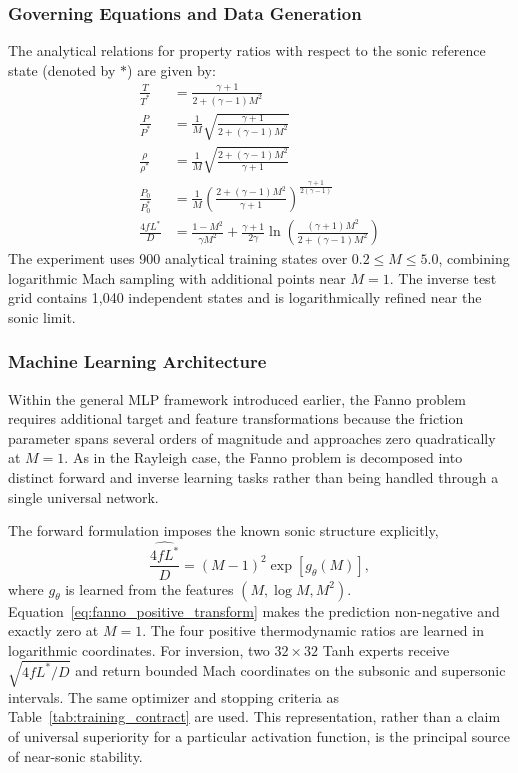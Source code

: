 \documentclass[preprint,12pt]{elsarticle}
\newcommand{\rev}[1]{#1}
\newenvironment{revision}{}{}
\newcommand{\rev}[1]{\textcolor{revisionblue}{#1}}
\newenvironment{revision}{\color{revisionblue}}{}
\begin{document}
\subsubsection{Governing Equations and Data Generation}
The analytical relations for property ratios with respect to the sonic reference state (denoted by $*$) are given by:
\begin{align}
    \frac{T}{T^*} &= \frac{\gamma+1}{2+(\gamma-1)M^2} \\
    \frac{P}{P^*} &= \frac{1}{M} \sqrt{\frac{\gamma+1}{2+(\gamma-1)M^2}} \\
    \frac{\rho}{\rho^*} &= \frac{1}{M} \sqrt{\frac{2+(\gamma-1)M^2}{\gamma+1}} \\
    \frac{P_0}{P_0^*} &= \frac{1}{M} \left( \frac{2+(\gamma-1)M^2}{\gamma+1} \right)^{\frac{\gamma+1}{2(\gamma-1)}} \\
    \frac{4fL^*}{D} &= \frac{1-M^2}{\gamma M^2} + \frac{\gamma+1}{2\gamma} \ln\left( \frac{(\gamma+1)M^2}{2+(\gamma-1)M^2} \right)
\end{align}
\rev{The experiment uses 900 analytical training states over $0.2\le M\le5.0$, combining logarithmic Mach sampling with additional points near $M=1$. The inverse test grid contains 1,040 independent states and is logarithmically refined near the sonic limit.}

\subsubsection{Machine Learning Architecture}
Within the general MLP framework introduced earlier, the Fanno problem requires additional target and feature transformations because the friction parameter spans several orders of magnitude and approaches zero quadratically at $M=1$. As in the Rayleigh case, the Fanno problem is decomposed into distinct forward and inverse learning tasks rather than being handled through a single universal network.

\begin{revision}
The forward formulation imposes the known sonic structure explicitly,
\begin{equation}
\widehat{\frac{4fL^*}{D}}=(M-1)^2\exp[g_\theta(M)],
\label{eq:fanno_positive_transform}
\end{equation}
where $g_\theta$ is learned from the features $(M,\log M,M^2)$. Equation~\ref{eq:fanno_positive_transform} makes the prediction non-negative and exactly zero at $M=1$. The four positive thermodynamic ratios are learned in logarithmic coordinates. For inversion, two $32\times32$ Tanh experts receive $\sqrt{4fL^*/D}$ and return bounded Mach coordinates on the subsonic and supersonic intervals. The same optimizer and stopping criteria as Table~\ref{tab:training_contract} are used. This representation, rather than a claim of universal superiority for a particular activation function, is the principal source of near-sonic stability.
\end{revision}
\end{document}
